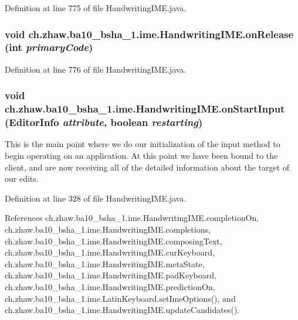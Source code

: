 Definition at line 775 of file HandwritingIME.java.\hypertarget{classch_1_1zhaw_1_1ba10__bsha__1_1_1ime_1_1HandwritingIME_adf013e6d8fc9b5d0e567fe93f5f6511a}{
\subsubsection[{onRelease}]{\setlength{\rightskip}{0pt plus 5cm}void ch.zhaw.ba10\_\-bsha\_\-1.ime.HandwritingIME.onRelease (int {\em primaryCode})}}
\label{classch_1_1zhaw_1_1ba10__bsha__1_1_1ime_1_1HandwritingIME_adf013e6d8fc9b5d0e567fe93f5f6511a}


Definition at line 776 of file HandwritingIME.java.\hypertarget{classch_1_1zhaw_1_1ba10__bsha__1_1_1ime_1_1HandwritingIME_abb0bfa8e1c7857a88657e6640855af0f}{
\subsubsection[{onStartInput}]{\setlength{\rightskip}{0pt plus 5cm}void ch.zhaw.ba10\_\-bsha\_\-1.ime.HandwritingIME.onStartInput (EditorInfo {\em attribute}, \/  boolean {\em restarting})}}
\label{classch_1_1zhaw_1_1ba10__bsha__1_1_1ime_1_1HandwritingIME_abb0bfa8e1c7857a88657e6640855af0f}
This is the main point where we do our initialization of the input method to begin operating on an application. At this point we have been bound to the client, and are now receiving all of the detailed information about the target of our edits. 

Definition at line 328 of file HandwritingIME.java.

References ch.zhaw.ba10\_\-bsha\_\-1.ime.HandwritingIME.completionOn, ch.zhaw.ba10\_\-bsha\_\-1.ime.HandwritingIME.completions, ch.zhaw.ba10\_\-bsha\_\-1.ime.HandwritingIME.composingText, ch.zhaw.ba10\_\-bsha\_\-1.ime.HandwritingIME.curKeyboard, ch.zhaw.ba10\_\-bsha\_\-1.ime.HandwritingIME.metaState, ch.zhaw.ba10\_\-bsha\_\-1.ime.HandwritingIME.padKeyboard, ch.zhaw.ba10\_\-bsha\_\-1.ime.HandwritingIME.predictionOn, ch.zhaw.ba10\_\-bsha\_\-1.ime.LatinKeyboard.setImeOptions(), and ch.zhaw.ba10\_\-bsha\_\-1.ime.HandwritingIME.updateCandidates().

